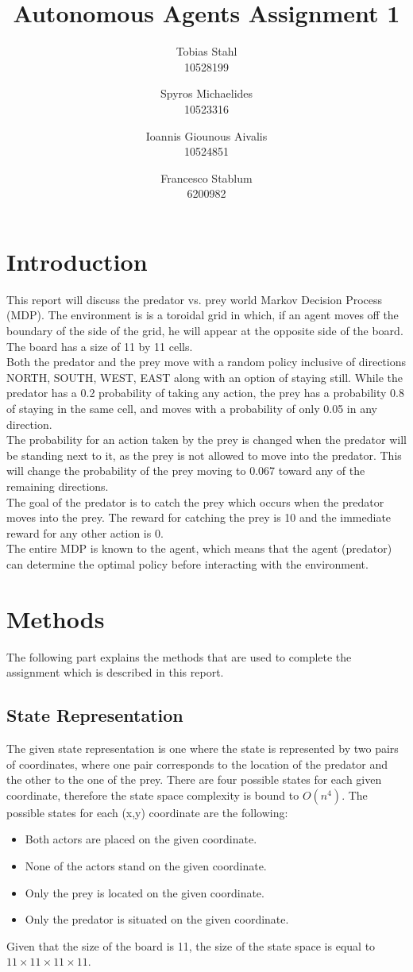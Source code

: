 \documentclass[11pt]{article}
\title{
	\textbf{Autonomous Agents Assignment 1}
}
\author{Tobias Stahl \\ 10528199 \and Spyros Michaelides \\ 10523316 \and Ioannis Giounous Aivalis \\ 10524851 \and Francesco Stablum \\ 6200982}
\begin{document}
\maketitle

\section{Introduction}
This report will discuss the predator vs. prey world Markov Decision Process (MDP). The environment is is a toroidal grid in which, if an agent moves off the boundary of the side of the grid, he will appear at the opposite side of the board. The board has a size of 11 by 11 cells.\\
Both the predator and the prey move with a random policy inclusive of directions NORTH, SOUTH, WEST, EAST along with an option of staying still. While the predator has a 0.2 probability of taking any action, the prey has a probability 0.8 of staying in the same cell, and moves with a probability of only 0.05 in any direction.\\
The probability for an action taken by the prey is changed when the predator will be standing next to it, as the prey is not allowed to move into the predator. This will change the probability of the prey moving to 0.067 toward any of the remaining directions.\\
The goal of the predator is to catch the prey which occurs when the predator moves into the prey. The reward for catching the prey is 10 and the immediate reward for any other action is 0.\\
The entire MDP is known to the agent, which means that the agent (predator) can determine the optimal policy before interacting with the environment.


\section{Methods}
The following part explains the methods that are used to complete the assignment which is described in this report.


\subsection{State Representation}
The given state representation is one where the state is represented by two pairs of coordinates, where one pair corresponds to the location of the predator and the other to the one of the prey. There are four possible states for each given coordinate, therefore the state space complexity is bound to $O(n^4)$.
The possible states for each (x,y) coordinate are the following:
\begin{itemize}
	\item Both actors are placed on the given coordinate.
	\item None of the actors stand on the given coordinate.
	\item Only the prey is located on the given coordinate.
	\item Only the predator is situated on the given coordinate.
\end{itemize}
Given that the size of the board is 11, the size of the state space is equal to $11 \times 11 \times 11 \times 11$.
\end{document}
